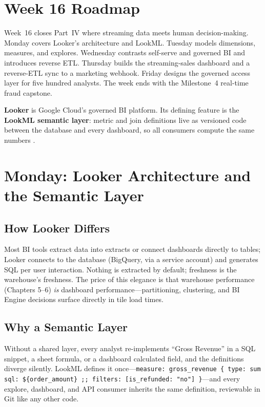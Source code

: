 \section{Week 16 Roadmap}
Week~16 closes Part~IV where streaming data meets human decision-making. Monday covers Looker's architecture and LookML. Tuesday models dimensions, measures, and explores. Wednesday contrasts self-serve and governed BI and introduces reverse ETL. Thursday builds the streaming-sales dashboard and a reverse-ETL sync to a marketing webhook. Friday designs the governed access layer for five hundred analysts. The week ends with the Milestone~4 real-time fraud capstone.

\begin{definitionbox}
\textbf{Looker} is Google Cloud's governed BI platform. Its defining feature is the \textbf{LookML semantic layer}: metric and join definitions live as versioned code between the database and every dashboard, so all consumers compute the same numbers \cite{googlecloudlookerdocs}.
\end{definitionbox}

\section{Monday: Looker Architecture and the Semantic Layer}

\subsection{How Looker Differs}
Most BI tools extract data into extracts or connect dashboards directly to tables; Looker connects to the database (BigQuery, via a service account) and generates SQL per user interaction. Nothing is extracted by default; freshness is the warehouse's freshness. The price of this elegance is that warehouse performance (Chapters 5--6) \emph{is} dashboard performance---partitioning, clustering, and BI Engine decisions surface directly in tile load times.

\subsection{Why a Semantic Layer}
Without a shared layer, every analyst re-implements ``Gross Revenue'' in a SQL snippet, a sheet formula, or a dashboard calculated field, and the definitions diverge silently. LookML defines it once---\texttt{measure: gross\_revenue \{ type: sum sql: \$\{order\_amount\} ;; filters: [is\_refunded: "no"] \}}---and every explore, dashboard, and API consumer inherits the same definition, reviewable in Git like any other code.

